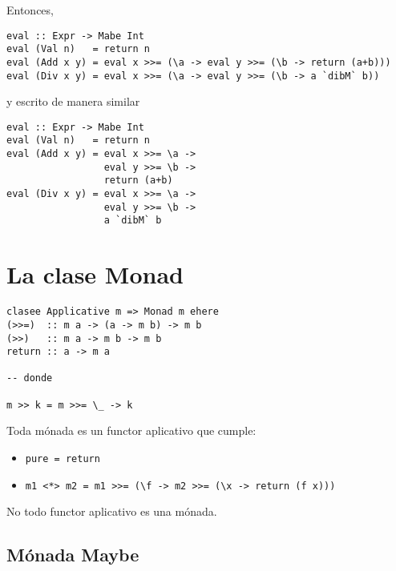 \documentclass{article}
\newcommand{\imp}[1]{\textcolor{color1}{#1}}
\begin{document}
Entonces,

\begin{lstlisting}
eval :: Expr -> Mabe Int
eval (Val n)   = return n
eval (Add x y) = eval x >>= (\a -> eval y >>= (\b -> return (a+b)))
eval (Div x y) = eval x >>= (\a -> eval y >>= (\b -> a `dibM` b))
\end{lstlisting}

y escrito de manera similar

\begin{lstlisting}
eval :: Expr -> Mabe Int
eval (Val n)   = return n
eval (Add x y) = eval x >>= \a -> 
                 eval y >>= \b -> 
                 return (a+b)
eval (Div x y) = eval x >>= \a -> 
                 eval y >>= \b -> 
                 a `dibM` b
\end{lstlisting}

\section{La clase Monad}

\begin{lstlisting}
clasee Applicative m => Monad m ehere
(>>=)  :: m a -> (a -> m b) -> m b
(>>)   :: m a -> m b -> m b
return :: a -> m a

-- donde

m >> k = m >>= \_ -> k
\end{lstlisting}

Toda mónada es un functor aplicativo que cumple:

\begin{itemize}
\item[]

\begin{lstlisting}
pure = return
\end{lstlisting}

\item[]

\begin{lstlisting}
m1 <*> m2 = m1 >>= (\f -> m2 >>= (\x -> return (f x)))
\end{lstlisting}
\end{itemize}

No todo \imp{functor aplicativo} es una \imp{mónada}.

\subsection{Mónada Maybe}
\end{document}
